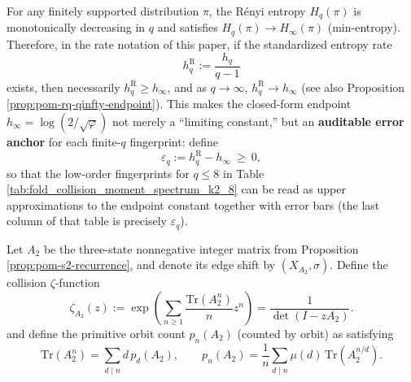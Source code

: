 \begin{remark}\label{rem:pom-renyi-gap-to-hinfty}
For any finitely supported distribution \(\pi\), the R\'enyi entropy \(H_q(\pi)\) is monotonically decreasing in \(q\) and satisfies \(H_q(\pi)\to H_\infty(\pi)\) (min-entropy).
Therefore, in the rate notation of this paper, if the standardized entropy rate
\[
h_q^{\mathrm R}:=\frac{h_q}{q-1}
\]
exists, then necessarily \(h_q^{\mathrm R}\ge h_\infty\), and as \(q\to\infty\), \(h_q^{\mathrm R}\to h_\infty\) (see also Proposition \ref{prop:pom-rq-qinfty-endpoint}).
This makes the closed-form endpoint \(h_\infty=\log(2/\sqrt{\varphi})\) not merely a ``limiting constant,'' but an \textbf{auditable error anchor} for each finite-\(q\) fingerprint: define
\[
\varepsilon_q:=h_q^{\mathrm R}-h_\infty\ \ge\ 0,
\]
so that the low-order fingerprints for \(q\le 8\) in Table \ref{tab:fold_collision_moment_spectrum_k2_8} can be read as upper approximations to the endpoint constant together with error bars (the last column of that table is precisely \(\varepsilon_q\)).
\end{remark}

\begin{definition}\label{def:pom-collision-zeta}
Let \(A_2\) be the three-state nonnegative integer matrix from Proposition \ref{prop:pom-s2-recurrence}, and denote its edge shift by \((X_{A_2},\sigma)\). Define the collision \(\zeta\)-function
$$
\zeta_{A_2}(z):=\exp\!\left(\sum_{n\ge 1}\frac{\mathrm{Tr}(A_2^n)}{n}z^n\right)
=\frac{1}{\det(I-zA_2)}.
$$
and define the primitive orbit count \(p_n(A_2)\) (counted by orbit) as satisfying
$$
\mathrm{Tr}(A_2^n)=\sum_{d\mid n} d\,p_d(A_2),
\qquad
p_n(A_2)=\frac{1}{n}\sum_{d\mid n}\mu(d)\,\mathrm{Tr}(A_2^{n/d}).
$$
\end{definition}




